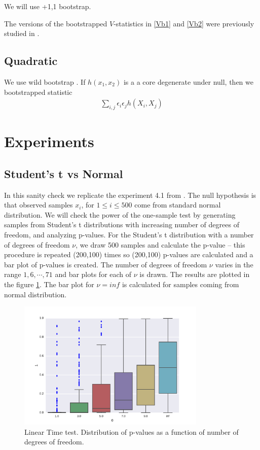 \documentclass{article}
\begin{document}
We will use {+1,1} bootstrap.

The versions of the bootstrapped $V$-statistics in \eqref{Vb1} and \eqref{Vb2} were previously studied in \cite{leucht_dependent_2013}. 

\subsection{Quadratic}
We use wild bootstrap . If $h(x_1,x_2)$ is a a core degenerate under null, then we bootstrapped statistic
\begin{align}
 \sum_{i,j} \epsilon_i \epsilon_j h(X_i,X_j)
\end{align}



\section{Experiments}

\subsection{Student's t vs Normal}
In this  sanity check we replicate the experiment 4.1 from \cite{gorham2015measuring}. The null hypothesis is that observed samples $x_i$, for $1 \leq i \leq 500$ come from standard normal distribution. We will check the power of the one-sample test by generating samples from Student's t distributions with increasing number of degrees of freedom, and analyzing p-values. For the Student's t distribution with a number of degrees of freedom $\nu$, we draw 500 samples and calculate the p-value -- this procedure is repeated (200,100) times so (200,100) p-values are calculated and a bar plot of p-values is created. The number of degrees of freedom $\nu$ varies in the range $1,6,\cdots,71$ and bar plots for each of $\nu$ is drawn.  The results are plotted in the figure \ref{fig:studentst}. The bar plot for $\nu = inf$ is calculated for samples coming from normal distribution.

\begin{figure}
\label{fig:studentst}
\includegraphics[width=0.8\textwidth]{./img/student.pdf}
\caption{Linear Time test. Distribution of p-values as a function of number of degrees of freedom.}
\end{figure}
\end{document}
